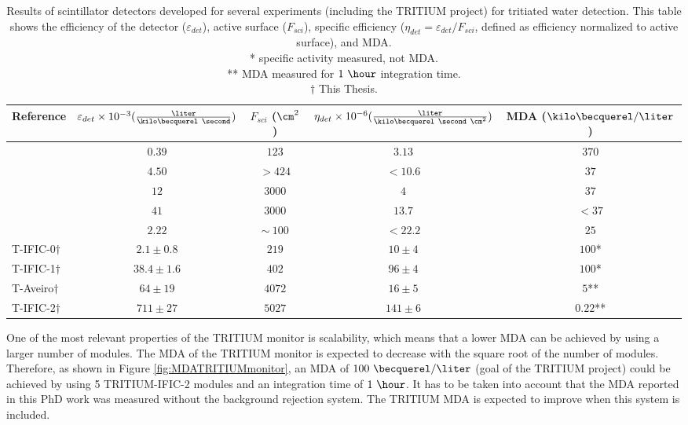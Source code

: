 \begin{enumerate}
\begin{table}[htbp]
\centering{}%
\begin{tabular}{lcccc}
\toprule 
Reference & \parbox{5.5em}{$\varepsilon_{det}\times10^{-3}\\(\frac{\liter}{\kilo\becquerel~\second})$}  & \parbox{4.5em}{$F_{sci}$\\ ($\cm^2$)}  & \parbox{6.5em}{$\eta_{det}\times 10^{-6}\\(\frac{\liter}{\kilo\becquerel~\second~\cm^2})$} &  \parbox{5.5em}{MDA\\($\kilo\becquerel / \liter$)} \tabularnewline
\midrule
\midrule 
\cite{Muramatsu} & $0.39$ & $123$ & $3.13$ & $370$ \tabularnewline
\cite{Moghissi} & $4.50$ & $>424$ & $<10.6$ & $37$ \tabularnewline
\cite{Osborne} & $12$ & $3000$ & $4$ & $37$ \tabularnewline
\cite{Ratnakaran} & $41$ & $3000$ & $13.7$ & $<37$ \tabularnewline
\cite{Hofstetter1} & $2.22$ & $\sim~100$ & $<22.2$ & $25$ \tabularnewline
T-IFIC-0$\dagger$ & $2.1 \pm 0.8$ & $219$ & $10 \pm 4$ & $100$* \tabularnewline
T-IFIC-1$\dagger$ & $38.4 \pm 1.6$ & $402$ & $96 \pm 4$ & $100$* \tabularnewline
T-Aveiro$\dagger$ & $64 \pm 19$ & $4072$ & $16 \pm 5$ & $5$** \tabularnewline
T-IFIC-2$\dagger$ & $711 \pm 27$ & $5027$ & $141 \pm 6$ & $0.22$** \tabularnewline
\bottomrule
\end{tabular}
\caption{Results of scintillator detectors developed for several experiments (including the TRITIUM project) for tritiated water detection. This table shows the efficiency of the detector ($\varepsilon_{det}$), active surface ($F_{sci}$), specific efficiency ($\eta_{det}=\varepsilon_{det}/F_{sci}$, defined as efficiency normalized to active surface), and MDA.\\
* specific activity measured, not MDA.\\ 
** MDA measured for $1~\hour$ integration time.\\
$\dagger$ This Thesis.}
\label{tab:ComparisonResultsTritium}
\end{table}

One of the most relevant properties of the TRITIUM monitor is scalability, which means that a lower MDA can be achieved by using a larger number of modules. The MDA of the TRITIUM monitor is expected to decrease with the square root of the number of modules. Therefore, as shown in Figure \ref{fig:MDATRITIUMmonitor}, an MDA of  $100~\becquerel/\liter$ (goal of the TRITIUM project) could be achieved by using 5 TRITIUM-IFIC-2 modules and an integration time of $1~\hour$. It has to be taken into account that the MDA reported in this PhD work was measured without the background rejection system. The TRITIUM MDA is expected to improve when this system is included.


\end{enumerate}
